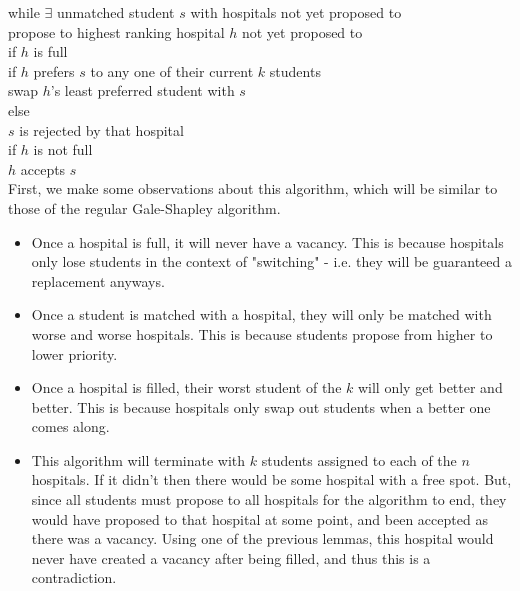 \documentclass[12pt]{article}
\begin{document}
while $\exists$ unmatched student $s$ with hospitals not yet proposed to\\
\hspace*{5mm} propose to highest ranking hospital $h$ not yet proposed to\\
\hspace*{5mm} if $h$ is full\\
\hspace*{10mm} if $h$ prefers $s$ to any one of their current $k$ students\\
\hspace*{15mm} swap $h$'s least preferred student with $s$\\
\hspace*{10mm} else\\
\hspace*{15mm} $s$ is rejected by that hospital\\
\hspace*{5mm} if $h$ is not full\\
\hspace*{10mm} $h$ accepts $s$\\

First, we make some observations about this algorithm, which will be similar to those of the regular Gale-Shapley algorithm. 
\begin{itemize}
\item Once a hospital is full, it will never have a vacancy. This is because hospitals only lose students in the context of "switching" - i.e. they will be guaranteed a replacement anyways.
\item Once a student is matched with a hospital, they will only be matched with worse and worse hospitals. This is because students propose from higher to lower priority. 
\item Once a hospital is filled, their worst student of the $k$ will only get better and better. This is because hospitals only swap out students when a better one comes along. 
\item This algorithm will terminate with $k$ students assigned to each of the $n$ hospitals. If it didn't then there would be some hospital with a free spot. But, since all students must propose to all hospitals for the algorithm to end, they would have proposed to that hospital at some point, and been accepted as there was a vacancy. Using one of the previous lemmas, this hospital would never have created a vacancy after being filled, and thus this is a contradiction.
\end{itemize}
\end{document}
